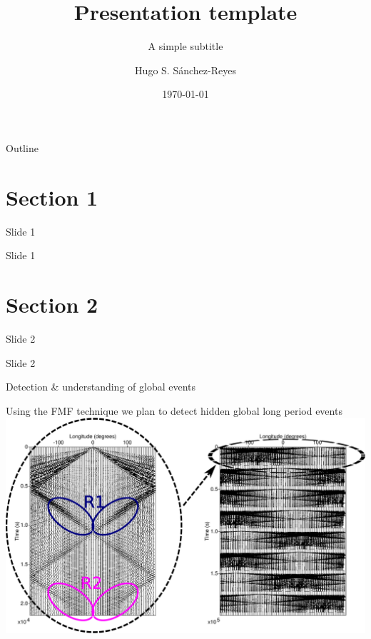 \documentclass[aspectratio=43,9pt]{beamer}
\title{Presentation template}								%
\subtitle{A simple subtitle}
\date{\today}
\author{Hugo S. S\'anchez-Reyes}								%
\institute{ISTerre, Universit\'e Grenoble Alpes}							%
\begin{document}
\maketitle


\begin{frame}{Outline}
\small \tableofcontents[hideallsubsections] 
\end{frame}


\section{Section 1}

\begin{frame}{Slide 1}

  \centering \huge Slide 1

\end{frame}


\section{Section 2}

\begin{frame}{Slide 2}

  \centering \huge Slide 2

\end{frame}




\begin{frame}{Detection \& understanding of global events}

   \vskip -0.3cm
   \centering Using the FMF technique we plan to detect hidden global long period events \\
   \vskip 0.3cm
   \includegraphics[width=1\linewidth]{figs/mixed_src_lat0_lon0-360}

\end{frame}
\end{document}

